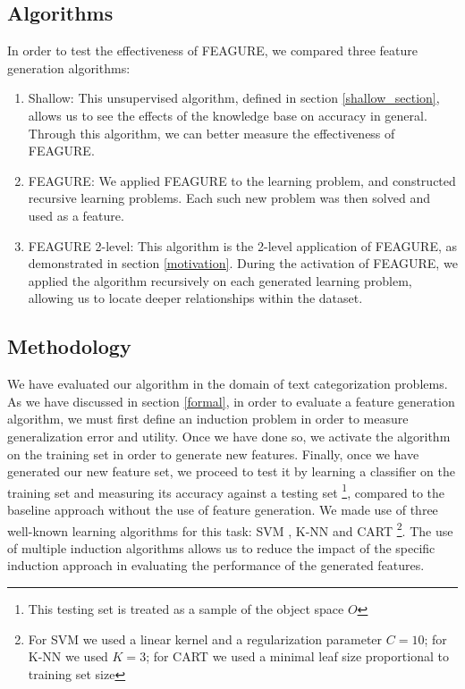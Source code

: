 \documentclass[twoside,11pt]{article}
\theoremstyle{definition}
\begin{document}
\subsection{Algorithms}

In order to test the effectiveness of FEAGURE, we compared three feature generation algorithms:
\begin{enumerate}
	\item Shallow: This unsupervised algorithm, defined in section \ref{shallow_section}, allows us to see the effects of the knowledge base on accuracy in general. Through this algorithm, we can better measure the effectiveness of FEAGURE.
	\item FEAGURE: We applied FEAGURE to the learning problem, and constructed recursive learning problems. Each such new problem was then solved and used as a feature.
	\item FEAGURE 2-level: This algorithm is the 2-level application of FEAGURE, as demonstrated in section \ref{motivation}. During the activation of FEAGURE, we applied the algorithm recursively on each generated learning problem, allowing us to locate deeper relationships within the dataset.
\end{enumerate}

\subsection{Methodology}

We have evaluated our algorithm in the domain of text categorization problems.
As we have discussed in section \ref{formal}, in order to evaluate a feature generation algorithm, we must first define an induction problem in order to measure generalization error and utility. Once we have done so, we activate the algorithm on the training set in order to generate new features. Finally, once we have generated our new feature set, we proceed to test it by learning a classifier on the training set and measuring its accuracy against a testing set \footnote{This testing set is treated as a sample of the object space $O$}, compared to the baseline approach without the use of feature generation. We made use of three well-known learning algorithms for this task: SVM \cite{cortes1995support}, K-NN \cite{fix1951discriminatory} and CART \cite{breiman1984classification}\footnote{For SVM we used a linear kernel and a regularization parameter $C=10$; for K-NN we used $K=3$; for CART we used a minimal leaf size proportional to training set size}.
The use of multiple induction algorithms allows us to reduce the impact of the specific induction approach in evaluating the performance of the generated features.
\end{document}
